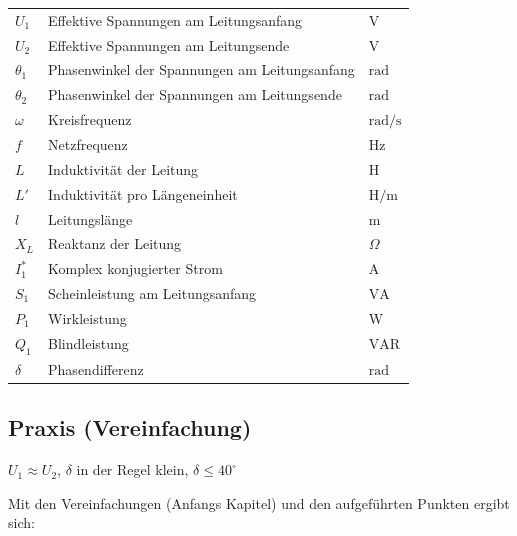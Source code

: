     \renewcommand{\arraystretch}{1.2}
    \begin{tabular}{@{} l p{6cm} l @{}}
    $U_1$        & Effektive Spannungen am Leitungsanfang \dotfill & $\mathrm{V}$ \\
    $U_2$        & Effektive Spannungen am Leitungsende \dotfill & $\mathrm{V}$ \\
    $\theta_1$ & Phasenwinkel der Spannungen am Leitungsanfang \dotfill & $\mathrm{rad}$ \\
    $\theta_2$ & Phasenwinkel der Spannungen am Leitungsende \dotfill & $\mathrm{rad}$ \\
    $\omega$            & Kreisfrequenz \dotfill & $\mathrm{rad/s}$ \\
    $f$                 & Netzfrequenz \dotfill & $\mathrm{Hz}$ \\
    $L$                 & Induktivität der Leitung \dotfill & $\mathrm{H}$ \\
    $L'$                & Induktivität pro Längeneinheit \dotfill & $\mathrm{H/m}$ \\
    $l$                 & Leitungslänge \dotfill & $\mathrm{m}$ \\
    $X_L$               & Reaktanz der Leitung  \dotfill & $\Omega$ \\
    $I_1^*$             & Komplex konjugierter Strom \dotfill & $\mathrm{A}$ \\
    $S_1$               & Scheinleistung am Leitungsanfang \dotfill & $\mathrm{VA}$ \\
    $P_1$               & Wirkleistung \dotfill & $\mathrm{W}$ \\
    $Q_1$               & Blindleistung \dotfill & $\mathrm{VAR}$ \\
    $\delta$           & Phasendifferenz \dotfill & $\mathrm{rad}$ \\
    \end{tabular}

\subsection{Praxis (Vereinfachung)}\label{Leistungsübertragung}
    $U_1 \approx U_2$, $\delta$ in der Regel klein, $\delta \leq 40^\circ$

    Mit den Vereinfachungen (Anfangs Kapitel) und den aufgeführten Punkten ergibt sich:

